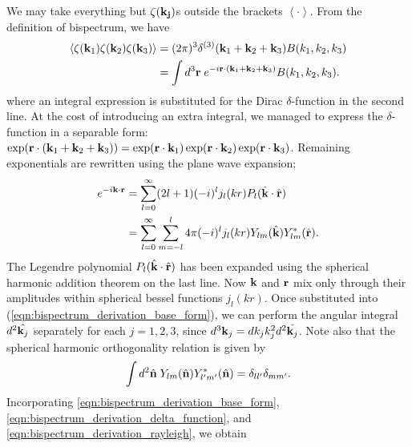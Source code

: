 We may take everything but $\zeta(\mathbf{k_j})$s outside the brackets $\left< \cdot \right>$. From the definition of bispectrum, we have
\begin{align}
	\left< \zeta(\mathbf{k}_1) \zeta(\mathbf{k}_2)  \zeta(\mathbf{k}_3) \right> &= (2\pi)^3 \delta^{(3)}(\mathbf{k}_1 + \mathbf{k}_2 + \mathbf{k}_3) B(k_1, k_2, k_3) \label{eqn:primordial_bispectrum}\\
	&= \int d^3 \mathbf{r} \; e^{-i\mathbf{r} \cdot (\mathbf{k}_1 + \mathbf{k}_2 + \mathbf{k}_3)}  B(k_1, k_2, k_3). \label{eqn:bispectrum_derivation_delta_function}
\end{align}
where an integral expression is substituted for the Dirac $\delta$-function in the second line. At the cost of introducing an extra integral, we managed to express the $\delta$-function in a separable form: $\exp(\mathbf{r} \cdot (\mathbf{k}_1+\mathbf{k}_2+\mathbf{k}_3)) = \exp(\mathbf{r}\cdot \mathbf{k}_1) \exp(\mathbf{r}\cdot \mathbf{k}_2) \exp(\mathbf{r}\cdot \mathbf{k}_3)$. Remaining exponentials are rewritten using the plane wave expansion;
\begin{align}
	e^{-i \mathbf{k} \cdot \mathbf{r}} &= \sum_{l=0}^{\infty} (2l+1) (-i)^l j_l(kr) P_l(\hat{\mathbf{k}} \cdot \hat{\mathbf{r}})  \\	
	&= \sum_{l=0}^{\infty} \sum_{m=-l}^{l} 4\pi (-i)^l j_l(kr) Y_{lm}(\hat{\mathbf{k}}) Y^*_{lm}(\hat{\mathbf{r}}). \label{eqn:bispectrum_derivation_rayleigh}
\end{align}
The Legendre polynomial $P_l(\hat{\mathbf{k}} \cdot \hat{\mathbf{r}})$ has been expanded using the spherical harmonic addition theorem on the last line. Now $\mathbf{k}$ and $\mathbf{r}$ mix only through their amplitudes within spherical bessel functions $j_l(kr)$. Once substituted into (\ref{eqn:bispectrum_derivation_base_form}), we can perform the angular integral $d^2 \hat{\mathbf{k}_j}$ separately for each $j=1,2,3$, since $d^3\mathbf{k}_j = dk_j k_j^2 d^2 \hat{\mathbf{k}_j}$. Note also that the spherical harmonic orthogonality relation is given by
\begin{align}
	\int d^2 \hat{\mathbf{n}} \; Y_{lm}(\hat{\mathbf{n}}) Y^*_{l'm'}(\hat{\mathbf{n}}) = \delta_{l l'} \delta_{m m'}.
\end{align}
Incorporating \eqref{eqn:bispectrum_derivation_base_form}, \eqref{eqn:bispectrum_derivation_delta_function}, and \eqref{eqn:bispectrum_derivation_rayleigh}, we obtain
